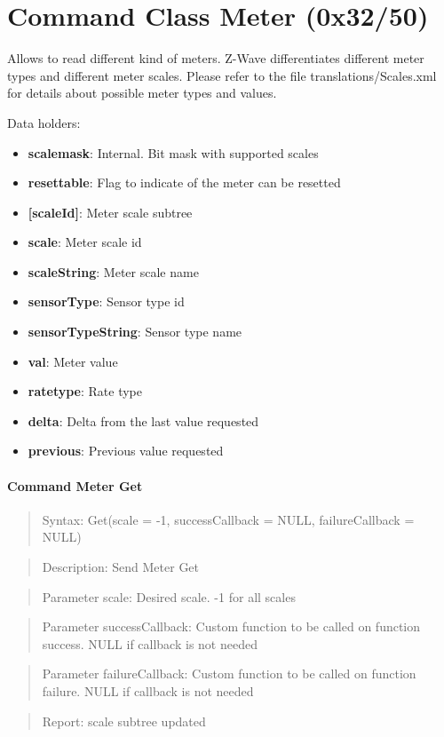 \section{Command Class Meter (0x32/50)}

Allows to read different kind of meters. Z-Wave differentiates different meter types and different meter scales. Please refer to the file translations/Scales.xml for details about possible meter types and values.
\newline

\noindent
Data holders:

\begin{itemize}
\item \textbf{scalemask}: Internal. Bit mask with supported scales
\item \textbf{resettable}: Flag to indicate of the meter can be resetted
\item \textbf{[scaleId]}: Meter scale subtree
\item \qquad\textbf{scale}: Meter scale id
\item \qquad\textbf{scaleString}: Meter scale name
\item \qquad\textbf{sensorType}: Sensor type id
\item \qquad\textbf{sensorTypeString}: Sensor type name
\item \qquad\textbf{val}: Meter value
\item \qquad\textbf{ratetype}: Rate type
\item \qquad\textbf{delta}: Delta from the last value requested
\item \qquad\textbf{previous}: Previous value requested
\end{itemize}

\paragraph{Command Meter Get}
\begin{quote}Syntax: Get(scale = -1, successCallback = NULL, failureCallback = NULL)\end{quote}
\begin{quote}Description: Send Meter Get\end{quote}
\begin{quote}Parameter scale: Desired scale. -1 for all scales\end{quote}
\begin{quote}Parameter successCallback: Custom function to be called on function success. NULL if callback is not needed\end{quote}
\begin{quote}Parameter failureCallback: Custom function to be called on function failure. NULL if callback is not needed\end{quote}
\begin{quote}Report: scale subtree updated\end{quote}

